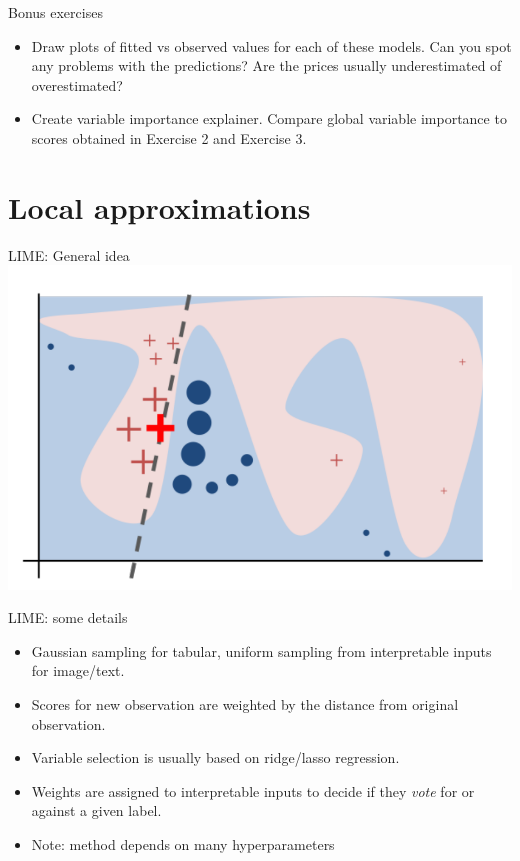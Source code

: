 \documentclass[xcolor={dvipsnames}]{beamer}
\begin{document}
\begin{frame}{Bonus exercises}
	\begin{itemize}
		\item Draw plots of fitted vs observed values for each of these models. Can you spot any problems with the predictions? Are the prices usually underestimated of overestimated?
		\item Create variable importance explainer. Compare global variable importance to scores obtained in Exercise 2 and Exercise 3.
	\end{itemize}	
	
\end{frame}

\section{Local approximations}

\begin{frame}{LIME: General idea}
\includegraphics[scale=0.4]{ilustracje_erum/lime_intuition.png}
\end{frame}

\begin{frame}{LIME: some details}
	\begin{itemize}
\item Gaussian sampling for tabular, uniform sampling from interpretable inputs for image/text.

\item Scores for new observation are weighted by the distance from original observation.

\item Variable selection is usually based on ridge/lasso regression.

\item Weights are assigned to interpretable inputs to decide if they \textit{vote} for or against a given label.

\item Note: method depends on many hyperparameters
	\end{itemize}
\end{frame}
\end{document}
